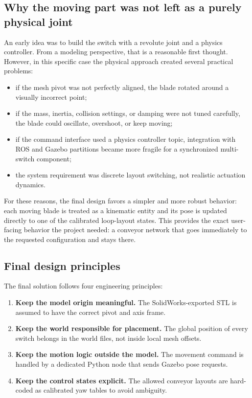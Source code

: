 \documentclass[11pt,a4paper]{article}
\begin{document}
\subsection{Why the moving part was not left as a purely physical joint}
An early idea was to build the switch with a revolute joint and a physics controller. From a modeling perspective, that is a reasonable first thought. However, in this specific case the physical approach created several practical problems:
\begin{itemize}
\item if the mesh pivot was not perfectly aligned, the blade rotated around a visually incorrect point;
\item if the mass, inertia, collision settings, or damping were not tuned carefully, the blade could oscillate, overshoot, or keep moving;
\item if the command interface used a physics controller topic, integration with ROS and Gazebo partitions became more fragile for a synchronized multi-switch component;
\item the system requirement was discrete layout switching, not realistic actuation dynamics.
\end{itemize}

For these reasons, the final design favors a simpler and more robust behavior: each moving blade is treated as a kinematic entity and its pose is updated directly to one of the calibrated loop-layout states. This provides the exact user-facing behavior the project needed: a conveyor network that goes immediately to the requested configuration and stays there.

\subsection{Final design principles}
The final solution follows four engineering principles:
\begin{enumerate}
\item \textbf{Keep the model origin meaningful.} The SolidWorks-exported STL is assumed to have the correct pivot and axis frame.
\item \textbf{Keep the world responsible for placement.} The global position of every switch belongs in the world files, not inside local mesh offsets.
\item \textbf{Keep the motion logic outside the model.} The movement command is handled by a dedicated Python node that sends Gazebo pose requests.
\item \textbf{Keep the control states explicit.} The allowed conveyor layouts are hard-coded as calibrated yaw tables to avoid ambiguity.
\end{enumerate}
\end{document}

